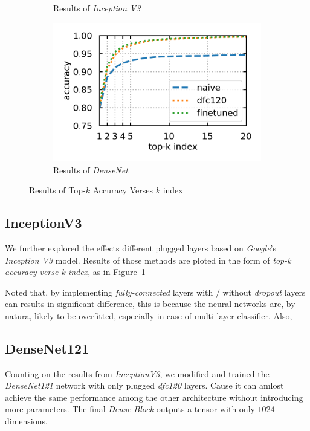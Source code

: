 \documentclass{article}
\begin{document}
\begin{figure}[htb]
\begin{subfigure}{0.48\linewidth}
		\caption{Results of \emph{Inception V3}}
		\label{fig:incetionp}
	\end{subfigure} 
	\begin{subfigure}{0.48\linewidth}
		\centering
		\includegraphics[width=\linewidth]{pics/DenseNet}
		\caption{Results of \emph{DenseNet}}
		\label{fig:densenet}
	\end{subfigure} 
	\label{fig:ress}
	\caption{Results of Top-$k$ Accuracy Verses $k$ index}
\end{figure}


\subsection{InceptionV3}
We further explored the effects different plugged layers based on \emph{Google}'s \emph{Inception V3} model. 
Results of those methods are ploted in the form of \emph{top-k accuracy verse k index}, as in Figure~\ref{fig:incetionp}

Noted that, by implementing \emph{fully-connected} layers with / without \emph{dropout} layers can results in significant difference, 
this is because the neural networks are, by natura, likely to be overfitted, especially in case of multi-layer classifier. 
Also, 

\subsection{DenseNet121}
Counting on the results from \emph{InceptionV3}, we modified and trained the \emph{DenseNet121} network with only plugged \emph{dfc120} layers. Cause it can amlost achieve the same performance among the other architecture without introducing more parameters. 
The final \emph{Dense Block} outputs a tensor with only $1024$ dimensions, 
\end{document}
